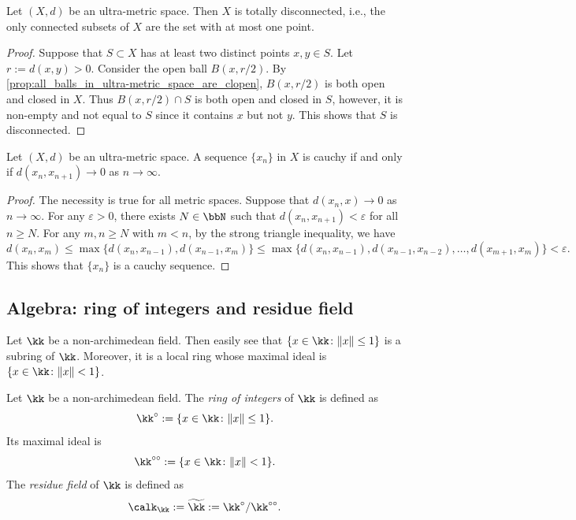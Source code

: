     \begin{corollary}\label{prop:ultra-metric_space_is_totally_disconnected}
        Let \((X,d)\) be an ultra-metric space.
        Then \(X\) is totally disconnected, i.e., the only connected subsets of \(X\) are the set with at most one point.
    \end{corollary}
    \begin{proof}
        Suppose that \(S \subset X\) has at least two distinct points \(x,y \in S\).
        Let \(r := d(x,y) > 0\).
        Consider the open ball \(B(x,r/2)\).
        By \cref{prop:all_balls_in_ultra-metric_space_are_clopen}, \(B(x,r/2)\) is both open and closed in \(X\).
        Thus \(B(x,r/2) \cap S\) is both open and closed in \(S\), however, it is non-empty and not equal to \(S\) since it contains \(x\) but not \(y\).
        This shows that \(S\) is disconnected.
    \end{proof}

    \begin{proposition}\label{prop:convergence_in_ultra-metric_space}
        Let \((X,d)\) be an ultra-metric space.
        A sequence \(\{x_n\}\) in \(X\) is cauchy if and only if \(d(x_n,x_{n+1}) \to 0\) as \(n \to \infty\).
    \end{proposition}
    \begin{proof}
        The necessity is true for all metric spaces.
        Suppose that \(d(x_n,x) \to 0\) as \(n \to \infty\).
        For any \(\varepsilon > 0\), there exists \(N \in \bbN\) such that \(d(x_n,x_{n+1}) < \varepsilon\) for all \(n \geq N\).
        For any \(m,n \geq N\) with \(m < n\), by the strong triangle inequality, we have
        \[ d(x_n,x_m) \leq \max\{d(x_n,x_{n-1}), d(x_{n-1},x_m)\} \leq \max\{d(x_n,x_{n-1}), d(x_{n-1},x_{n-2}), \ldots, d(x_{m+1},x_m)\} < \varepsilon. \]
        This shows that \(\{x_n\}\) is a cauchy sequence.
    \end{proof}


\subsection{Algebra: ring of integers and residue field}

    Let \(\kk\) be a non-archimedean field.
    Then easily see that \(\{x \in \kk\colon \|x\|\leq 1\}\) is a subring of \(\kk\).
    Moreover, it is a local ring whose maximal ideal is \(\{x \in \kk\colon \|x\| < 1\}\).

    \begin{definition}\label{def:non-archimedean_field_ring_of_integers_maximal_ideal_and_residue_field}
        Let \(\kk\) be a non-archimedean field.
        The \emph{ring of integers} of \(\kk\) is defined as
        \[ \kk^\circ := \{x \in \kk\colon \|x\|\leq 1\}. \]
        Its maximal ideal is
        \[ \kk^{\circ\circ} := \{x \in \kk\colon \|x\| < 1\}. \]
        The \emph{residue field} of \(\kk\) is defined as
        \[ \calk_\kk := \widetilde{\kk} := \kk^\circ / \kk^{\circ\circ}. \]
    \end{definition}

